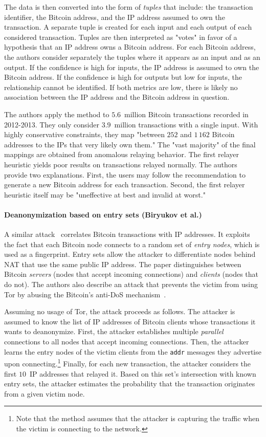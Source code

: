 The data is then converted into the form of \textit{tuples} that include: the transaction identifier, the Bitcoin address, and the IP address assumed to own the transaction.
A separate tuple is created for each input and each output of each considered transaction.
Tuples are then interpreted as "votes" in favor of a hypothesis that an IP address owns a Bitcoin address.
For each Bitcoin address, the authors consider separately the tuples where it appears as an input and as an output.
If the confidence is high for inputs, the IP address is assumed to own the Bitcoin address.
If the confidence is high for outputs but low for inputs, the relationship cannot be identified.
If both metrics are low, there is likely no association between the IP address and the Bitcoin address in question.

The authors apply the method to $5.6$~million Bitcoin transactions recorded in 2012-2013.
They only consider $3.9$~million transactions with a single input.
With highly conservative constraints, they map "between $252$ and $1\,162$ Bitcoin addresses to the IPs that very likely own them."
The "vast majority" of the final mappings are obtained from anomalous relaying behavior.
The first relayer heuristic yields poor results on transactions relayed normally.
The authors provide two explanations.
First, the users may follow the recommendation to generate a new Bitcoin address for each transaction.
Second, the first relayer heuristic itself may be "uneffective at best and invalid at worst."


\paragraph{Deanonymization based on entry sets (Biryukov et al.)}

A similar attack~\cite{Biryukov2014} correlates Bitcoin transactions with IP addresses.
It exploits the fact that each Bitcoin node connects to a random set of \textit{entry nodes}, which is used as a fingerprint.
Entry sets allow the attacker to differentiate nodes behind NAT that use the same public IP address.
The paper distinguishes between Bitcoin \textit{servers} (nodes that accept incoming connections) and \textit{clients} (nodes that do not).
The authors also describe an attack that prevents the victim from using Tor by abusing the Bitcoin's anti-DoS mechanism~\cite{Biryukov2015}.

Assuming no usage of Tor, the attack proceeds as follows.
The attacker is assumed to know the list of IP addresses of Bitcoin clients whose transactions it wants to deanonymize.
First, the attacker establishes multiple \textit{parallel} connections to all nodes that accept incoming connections.
Then, the attacker learns the entry nodes of the victim clients from the \texttt{addr} messages they advertise upon connecting.\footnote{Note that the method assumes that the attacker is capturing the traffic when the victim is connecting to the network.}
Finally, for each new transaction, the attacker considers the first $10$~IP addresses that relayed it.
Based on this set's intersection with known entry sets, the attacker estimates the probability that the transaction originates from a given victim node.


